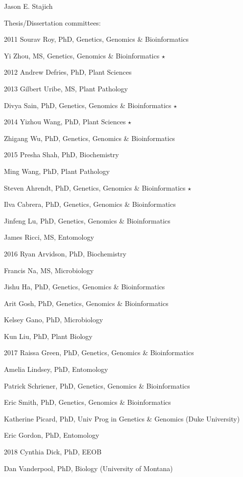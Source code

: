\documentclass[10pt]{article}
\begin{document}
\begin{cv}{\centerline{Jason E. Stajich}}
\begin{cvlistcompact}{Thesis/Dissertation committees:}
\item [2011] Sourav Roy, PhD, Genetics, Genomics \& Bioinformatics
\item Yi Zhou, MS, Genetics, Genomics \& Bioinformatics $\star$
\item [2012] Andrew Defries, PhD, Plant Sciences
\item [2013] Gilbert Uribe, MS, Plant Pathology
\item Divya Sain, PhD, Genetics, Genomics \& Bioinformatics $\star$
\item [2014] Yizhou Wang, PhD, Plant Sciences $\star$
\item Zhigang Wu, PhD, Genetics, Genomics \& Bioinformatics
\item [2015] Presha Shah, PhD, Biochemistry
\item Ming Wang, PhD, Plant Pathology
\item Steven Ahrendt, PhD, Genetics, Genomics \& Bioinformatics $\star$
\item Ilva Cabrera, PhD, Genetics, Genomics \& Bioinformatics
\item Jinfeng Lu, PhD, Genetics, Genomics \& Bioinformatics
\item James Ricci, MS, Entomology
\item [2016] Ryan Arvidson, PhD, Biochemistry
\item Francis Na, MS, Microbiology
\item Jishu Ha, PhD, Genetics, Genomics \& Bioinformatics
\item Arit Gosh, PhD, Genetics, Genomics \& Bioinformatics
\item Kelsey Gano, PhD, Microbiology
\item Kun Liu, PhD, Plant Biology
\item [2017] Raissa Green, PhD, Genetics, Genomics \& Bioinformatics
\item Amelia Lindsey, PhD, Entomology
\item Patrick Schriener, PhD, Genetics, Genomics \& Bioinformatics
\item Eric Smith, PhD, Genetics, Genomics \& Bioinformatics
\item Katherine Picard, PhD, Univ Prog in Genetics \& Genomics (Duke University)
\item Eric Gordon, PhD, Entomology
\item [2018] Cynthia Dick, PhD, EEOB
\item Dan Vanderpool, PhD, Biology (University of Montana)

\end{cvlistcompact}
\end{cv}
\end{document}

